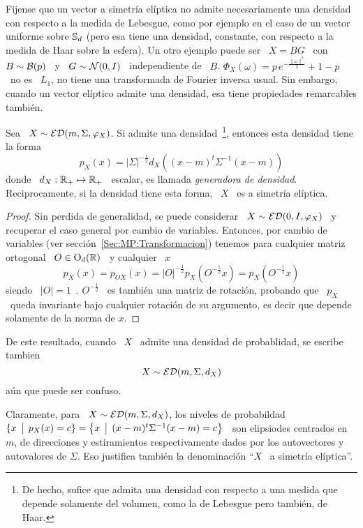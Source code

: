 Fijense  que  un vector  a  simetr\'ia  el\'iptica  no admite  necesariamente  una
densidad con respecto a la medida de  Lebesgue, como por ejemplo en el caso de un
vector uniforme  sobre $\mathbb{S}_d$  (pero esa tiene  una densidad,  constante, con
respecto a la medida de Haar sobre la esfera). Un otro ejemplo puede ser \ $X = B
G$  \ con  \  $B \sim  \mathcal{B}(p)$  \  y \  $G  \sim \mathcal{N}(0,I)$  \  independiente de  \
$B$. $\Phi_X(\omega)  = p \, e^{-\frac{\|  \omega \|^2}{2}} + 1  - p$ \  no es \
$L_1$,  \ie no tiene  una transformada  de Fourier  inversa usual.  Sin embargo,
cuando un vector el\'iptico admite una densidad, esa tiene propiedades remarcables
tambi\'en.
%
\begin{teorema}
%
  Sea \ $X \sim \mathcal{ED}(m,\Sigma,\varphi_X)$. Si  admite una  densidad~\footnote{De hecho, sufice  que admita
    una densidad  con respecto  a una medida  que depende solamente  del volumen,
    como la de Lebesgue pero  tambi\'en, de Haar.}, entonces esta densidad tiene
  la forma
  \[
  p_X(x)  = |\Sigma|^{-\frac12} d_X\left( (x-m)^t \Sigma^{-1} (x-m) \right)
  \]
  donde \ $d_X:  \mathbb{R}_+ \mapsto \mathbb{R}_+$ \ escalar,  es llamada {\em generadora
    de densidad}. Reciprocamente, si la densidad  tiene esta forma, \ $X$ \ es a
  simetr\'ia el\'iptica.
\end{teorema}
%
\begin{proof}
  Sin perdida de generalidad, se  puede considerar \ $X \sim \mathcal{ED}(0,I,\varphi_X)$
  \ y recuperar  el caso general por cambio de  variables.  Entonces, por cambio
  de   variables   (ver   secci\'on~\ref{Sec:MP:Transformacion})  tenemos   para
  cualquier matriz ortogonal \ $O \in \mathrm{O}_d(\mathbb{R})$ \ y cualquier \ $x$
  \[
  p_X(x)  = p_{O  X}(x)  =  |O|^{-\frac12} p_X\left(  O^{-\frac12}  x \right)  =
  p_X\left( O^{-\frac12} x \right)
  \]
  siendo \ $|O|  = 1$~\cite{Bha97, HorJoh13}. $O^{-\frac12}$ \  es tambi\'en una
  matriz de rotaci\'on,  probando que \ $p_X$ \  queda invariante bajo cualquier
  rotaci\'on de su argumento, es decir que depende solamente de la norma de $x$.
\end{proof}

De este resultado, cuando \ $X$ \ admite una densidad de probablidad, se escribe tambien
%
\[
X \sim \mathcal{ED}(m,\Sigma,d_X)
\]
%
a\'un que puede ser confuso.

Claramente, para \ $X \sim  \mathcal{ED}(m,\Sigma,d_X)$, los niveles de probabildad \ $\{
x \:\: \big| \:\: p_X(x)  = c \} = \left\{  x \:\: \big| \:\: (x-m)^t \Sigma^{-1} (x-m) =  c \right\}$ \
son   elipsiodes  centrados   en   \  $m$,   de   direcciones  y   estiramientos
respectivamente  dados  por los  autovectores  y  autovalores  de $\Sigma$.  Eso
justifica tambi\'en la denominaci\'on ``$X$ \ a simetr\'ia el\'iptica''.

